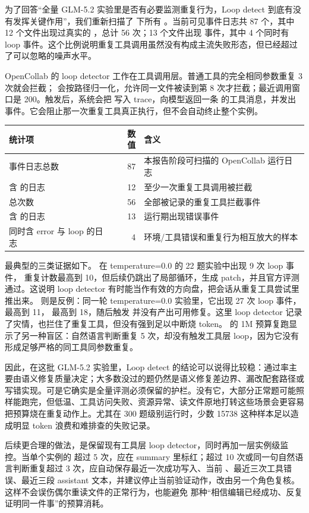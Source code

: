 \documentclass[UTF8,a4paper,11pt]{ctexart}
\begin{document}
为了回答“全量 GLM-5.2 实验里是否有必要监测重复行为，Loop detect 到底有没有发挥关键作用”，我们重新扫描了  下所有 。当前可见事件日志共 87 个，其中 12 个文件出现过真实的 ，总计 56 次；13 个文件出现  事件，其中 4 个同时有 loop 事件。这个比例说明重复工具调用虽然没有构成主流失败形态，但已经超过了可以忽略的噪声水平。

OpenCollab 的 loop detector 工作在工具调用层。普通工具的完全相同参数重复 3 次就会拦截； 会按路径归一化，允许同一文件被读到第 8 次才拦截；最近调用窗口是 200。触发后，系统会把  写入 trace，向模型返回一条  的工具消息，并发出  事件。它会阻止那一次重复工具真正执行，但不会自动终止整个实例。

\begin{center}
{\scriptsize
\begin{tabular}{L{5.1cm} r L{7.0cm}}
\toprule
统计项 & 数值 & 含义 \\
\midrule
事件日志总数 & 87 & 本报告阶段可扫描的 OpenCollab 运行日志 \\
含  的日志 & 12 & 至少一次重复工具调用被拦截 \\
 总次数 & 56 & 全部被记录的重复工具拦截事件 \\
含  的日志 & 13 & 运行期出现错误事件 \\
同时含 error 与 loop 的日志 & 4 & 环境/工具错误和重复行为相互放大的样本 \\
\bottomrule
\end{tabular}
}
\end{center}

最典型的三类证据如下。 在 temperature=0.0 的 22 题实验中出现 9 次 loop 事件， 重复计数最高到 10，但后续仍跳出了局部循环，生成 patch，并且官方评测通过。这说明 loop detector 有时能当作有效的方向盘，把会话从重复工具尝试里推出来。 则是反例：同一轮 temperature=0.0 实验里，它出现 27 次 loop 事件， 最高到 11， 最高到 18，随后触发  并没有产出可用修复。这里 loop detector 记录了灾情，也拦住了重复工具，但没有强到足以中断烧 token。 的 1M 预算复跑显示了另一种盲区：自然语言判断重复 5 次，却没有触发工具层 loop，因为它没有形成足够严格的同工具同参数重复。

因此，在这批 GLM-5.2 实验里，Loop detect 的结论可以说得比较稳：通过率主要由语义修复质量决定；大多数没过的题仍然是语义修复差边界、漏改配套路径或写错实现。可是它确实是全量评测必须保留的护栏。没有它，大部分正常题可能照样能跑完，但低温、工具访问失败、资源异常、读文件原地打转这些场景会更容易把预算烧在重复动作上。尤其在 300 题级别运行时，少数 15738 这种样本足以造成明显 token 浪费和难排查的失败记录。

后续更合理的做法，是保留现有工具层 loop detector，同时再加一层实例级监控。当单个实例的  超过 5 次，应在 summary 里标红；超过 10 次或同一句自然语言判断重复超过 3 次，应自动保存最近一次成功写入、当前 、最近三次工具错误、最近三段 assistant 文本，并建议停止当前验证动作，改由另一个角色复核。这样不会误伤偶尔重读文件的正常行为，也能避免  那种“相信编辑已经成功、反复证明同一件事”的预算消耗。
\end{document}
